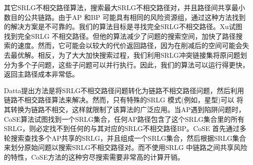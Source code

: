 其它SRLG不相交路径算法\cite{rostami2012msdp,rostami2007cose,datta2008graph,xu2003new,todimala2004imsh}，搜索最大SRLG不相交路径对，并且路径间共享最小数目的公共链路。由于AP 和BP 可能具有相同的风险资源组，通过这种方法找到的解决方案是不可靠的。我们的算法目标是寻找完全SRLG不相交路径。Xu\cite{xu2003trap}试图找到完全SRLG 不相交路径。但他的算法减少了问题的搜索空间，加快了路径搜索的速度。然而，它可能会以较大的代价返回路径，因为在削减后的空间可能会失去最优解。相反，为了大大加快搜索过程，我们利用SRLG冲突链接集将原问题划分为多个子问题，这些子问题可以并行执行。因此，我们的算法可以运行得更快，返回主路径成本非常低。

Datta\cite{datta2008graph}提出方法是将SRLG不相交路径问题转化为链路不相交路径问题，然后利用链路不相交路径算法来解决。然而，只有特殊的SRLG 模式(例如，星型)可以
将其转换为链路不相交，这样就限制了该算法的广泛应用。当AP遇到陷阱问题时，CoSE\cite{rostami2007cose}算法试图找到一个SRLG集合，任何AP路径包含了这个SRLG集合里的所有SRLG，则必定找不到任何的与其对应的SRLG不相交路径BP。CoSE 首先通过多轮搜索查找多个AP共享的SRLG，并且组成一个SRLG集合，然后根据SRLG集合来划分原始问题以搜索SRLG不相交路径对。而不使用SRLG 中链路之间共享风险的特性，CoSE方法的这种穷尽搜索需要非常高的计算开销。



